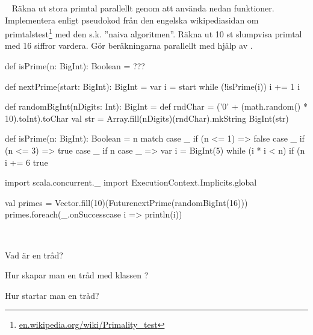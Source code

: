 \QUESTEND






\WHAT{}

\QUESTBEGIN

\Task  \what~ Räkna ut stora primtal parallellt genom att använda nedan funktioner. Implementera  enligt pseudokod från den engelska wikipediasidan om primtalstest\footnote{\href{https://en.wikipedia.org/wiki/Primality_test}{en.wikipedia.org/wiki/Primality\_test}} med den s.k. ''naiva algoritmen''.  Räkna ut 10 st slumpvisa primtal med 16 siffror vardera. Gör beräkningarna parallellt med hjälp av .

\begin{Code}
def isPrime(n: BigInt): Boolean = ???

def nextPrime(start: BigInt): BigInt = {
  var i = start
  while (!isPrime(i)) { i += 1 }
  i
}

def randomBigInt(nDigits: Int): BigInt = {
   def rndChar = ('0' + (math.random() * 10).toInt).toChar
   val str = Array.fill(nDigits)(rndChar).mkString
   BigInt(str)
}
\end{Code}

\SOLUTION


\TaskSolved \what

\begin{Code}
def isPrime(n: BigInt): Boolean = n match {
  case _ if (n <= 1) => false
  case _ if (n <= 3) => true
  case _ if n %
  case _ =>
    var i = BigInt(5)
    while (i * i < n) {
      if (n %
      i += 6
    }
    true
}

import scala.concurrent._
import ExecutionContext.Implicits.global

val primes = Vector.fill(10)(Future{nextPrime(randomBigInt(16))})
primes.foreach(_.onSuccess{case i => println(i)})
\end{Code}


\QUESTEND







\QUESTBEGIN

\Task  \what~\Pen

\Subtask Vad är en tråd?

\Subtask Hur skapar man en tråd med klassen ?

\Subtask Hur startar man en tråd?

